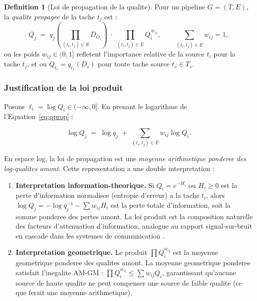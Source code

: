 \documentclass[12pt,a4paper]{article}
\theoremstyle{plain}
\theoremstyle{definition}
\newtheorem{definition}[theorem]{Definition}
\theoremstyle{remark}
\begin{document}
\begin{definition}[Loi de propagation de la qualite]
\label{def:qprop}
Pour un pipeline $G=(T,E)$, la \emph{qualite propagee} de la tache
$t_j$ est :
\begin{equation}
Q_j \;=\; q_j\!\left(\prod_{(t_i,t_j)\in E} D_{O_i}\right)
\;\cdot\;
\prod_{(t_i,t_j)\in E} Q_i^{\,w_{ij}},
\qquad
\sum_{(t_i,t_j)\in E} w_{ij} = 1,
\label{eq:qprop}
\end{equation}
ou les poids $w_{ij} \in (0,1]$ refletent l'importance relative de
la source $t_i$ pour la tache $t_j$, et ou $Q_{t_s} = q_{t_s}(D_s)$
pour toute tache source $t_s \in T_s$.
\end{definition}

\subsubsection{Justification de la loi produit}
\label{subsec:product_justification}

Posons $\ell_i = \log Q_i \in (-\infty, 0]$. En prenant le logarithme
de l'Equation~\eqref{eq:qprop} :

\begin{equation}
\log Q_j \;=\; \log q_j \;+\; \sum_{(t_i,t_j)\in E} w_{ij} \log Q_i.
\label{eq:logprop}
\end{equation}

En espace log, la loi de propagation est une \emph{moyenne arithmetique
ponderee des log-qualites amont}. Cette representation a une double
interpretation :

\begin{enumerate}[leftmargin=1.5em,itemsep=2pt]
  \item \textbf{Interpretation information-theorique.}
    Si $Q_i = e^{-H_i}$ ou $H_i \geq 0$ est la perte d'information
    normalisee (entropie d'erreur) a la tache $t_i$, alors
    $\log Q_j = -\log q_j^{-1} - \sum w_{ij} H_i$ est la perte
    totale d'information, soit la somme ponderee des pertes amont.
    La loi produit est la composition naturelle des facteurs
    d'attenuation d'information, analogue au rapport signal-sur-bruit
    en cascade dans les systemes de communication \cite{shannon_info}.

  \item \textbf{Interpretation geometrique.}
    Le produit $\prod Q_i^{w_{ij}}$ est la moyenne geometrique ponderee
    des qualites amont. La moyenne geometrique ponderee satisfait
    l'inegalite AM-GM : $\prod Q_i^{w_{ij}} \leq \sum w_{ij} Q_i$,
    garantissant qu'aucune source de haute qualite ne peut compenser
    une source de faible qualite (ce que ferait une moyenne arithmetique).
\end{enumerate}
\end{document}
